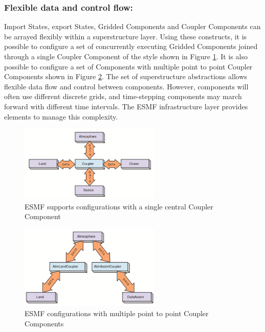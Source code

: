 \subsubsection{Flexible data and control flow:}
Import States, export States, Gridded Components and Coupler Components can be arrayed flexibly within a superstructure layer. Using these constructs, it is possible to configure a set of concurrently executing Gridded Components joined through a single Coupler Component of the style shown in Figure \ref{fig:ESMF supports configurations with a single central Coupler Component}. It is also possible to configure a set of Components with multiple point to point Coupler Components shown in Figure \ref{fig:ESMF configurations with multiple point to point Coupler Components}.  The set of superstructure abstractions allows flexible data flow and control between components. However, components will often use different discrete grids, and time-stepping components may march forward with different time intervals. The ESMF infrastructure layer provides elements to manage this complexity.

\begin{figure}[htbp]
\centering
\includegraphics[width=0.6\textwidth]{pics/esmf/Figure5.png}
\caption{ESMF supports configurations with a single central Coupler Component}
\label{fig:ESMF supports configurations with a single central Coupler Component}
\end{figure}

\begin{figure}[htbp]
\centering
\includegraphics[width=0.6\textwidth]{pics/esmf/Figure6.png}
\caption{ESMF configurations with multiple point to point Coupler Components}
\label{fig:ESMF configurations with multiple point to point Coupler Components}
\end{figure}

